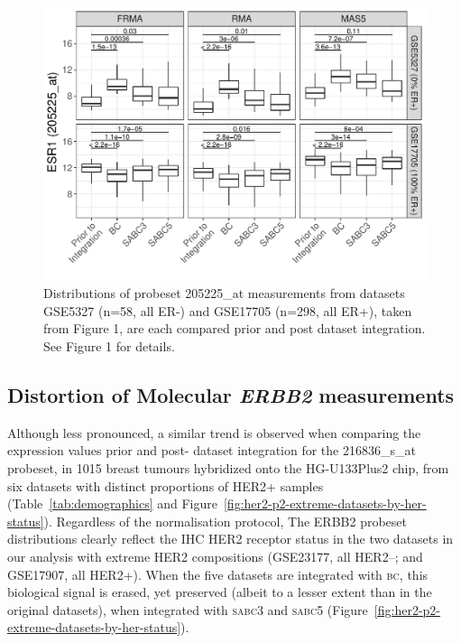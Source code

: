 \documentclass{article}\usepackage[]{graphicx}\usepackage[]{color}
\makeatletter
\def\maxwidth{ %
  \ifdim\Gin@nat@width>\linewidth
    \linewidth
  \else
    \Gin@nat@width
  \fi
}
\newenvironment{knitrout}{}{} %
\makeatother
\begin{document}
\begin{knitrout}
\color{fgcolor}\begin{figure}

{\centering \includegraphics[width=\maxwidth]{figure/er-a-extreme-datasets-by-integration-1} 

}

\caption[Distributions of probeset 205225\_at measurements from datasets GSE5327 (n=58, all ER-) and GSE17705 (n=298, all ER+), taken from Figure 1, are each compared prior and post dataset integration]{Distributions of probeset 205225\_at measurements from datasets GSE5327 (n=58, all ER-) and GSE17705 (n=298, all ER+), taken from Figure 1, are each compared prior and post dataset integration.  See Figure 1 for details.}\label{fig:er-a-extreme-datasets-by-integration}
\end{figure}


\end{knitrout}

\subsection{Distortion of Molecular \emph{ERBB2} measurements}
\label{sec:distortion-ERBB2}

Although less pronounced, a similar trend is observed when comparing the
expression values prior and post- dataset integration for the
\textsf{216836\_s\_at} probeset, in 1015 breast tumours hybridized onto the
HG-U133Plus2 chip, from six datasets with distinct proportions of HER2+ samples
(Table~\ref{tab:demographics} and
Figure~\ref{fig:her2-p2-extreme-datasets-by-her-status}).  Regardless of the
normalisation protocol, The ERBB2 probeset distributions clearly reflect the IHC
HER2 receptor status in the two datasets in our analysis with extreme HER2
compositions (GSE23177, all HER2--; and GSE17907, all HER2+).  When the five
datasets are integrated with \textsc{bc}, this biological signal is erased, yet
preserved (albeit to a lesser extent than in the original datasets), when
integrated with \textsc{sabc3} and \textsc{sabc5}
(Figure~\ref{fig:her2-p2-extreme-datasets-by-her-status}).
\end{document}
